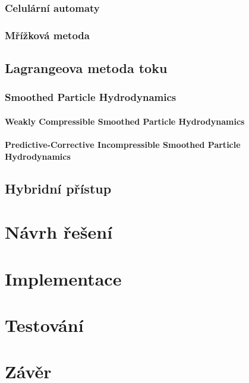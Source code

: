 \subsection{Celulární automaty}
\subsection{Mřížková metoda}
\section{Lagrangeova metoda toku}
\subsection{Smoothed Particle Hydrodynamics}
\subsubsection{Weakly Compressible Smoothed Particle Hydrodynamics}
\subsubsection{Predictive-Corrective Incompressible Smoothed Particle Hydrodynamics}
\section{Hybridní přístup}




\chapter{Návrh řešení}
\label{chapter:navrh_resení}

\chapter{Implementace}
\label{chapter:implementace}

\chapter{Testování}
\label{chapter:testovani}

\chapter{Závěr}
\label{chapter:zaver}





